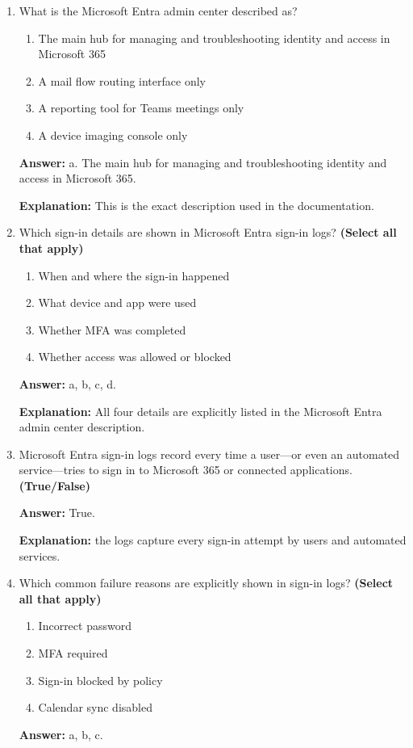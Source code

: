 \documentclass[10pt]{article}
\begin{document}
\begin{enumerate}[leftmargin=*]
\item What is the Microsoft Entra admin center described as?
\begin{enumerate}[label=\alph*., leftmargin=1.5em]
\item The main hub for managing and troubleshooting identity and access in Microsoft 365
\item A mail flow routing interface only
\item A reporting tool for Teams meetings only
\item A device imaging console only
\end{enumerate}
\textbf{Answer:} a. The main hub for managing and troubleshooting identity and access in Microsoft 365.

\textbf{Explanation:} This is the exact description used in the documentation.

\item Which sign-in details are shown in Microsoft Entra sign-in logs? \textbf{(Select all that apply)}
\begin{enumerate}[label=\alph*., leftmargin=1.5em]
\item When and where the sign-in happened
\item What device and app were used
\item Whether MFA was completed
\item Whether access was allowed or blocked
\end{enumerate}
\textbf{Answer:} a, b, c, d.

\textbf{Explanation:} All four details are explicitly listed in the Microsoft Entra admin center description.

\item Microsoft Entra sign-in logs record every time a user—or even an automated service—tries to sign in to Microsoft 365 or connected applications. \textbf{(True/False)}

\textbf{Answer:} True.

\textbf{Explanation:} the logs capture every sign-in attempt by users and automated services.

\item Which common failure reasons are explicitly shown in sign-in logs? \textbf{(Select all that apply)}
\begin{enumerate}[label=\alph*., leftmargin=1.5em]
\item Incorrect password
\item MFA required
\item Sign-in blocked by policy
\item Calendar sync disabled
\end{enumerate}
\textbf{Answer:} a, b, c.


\end{enumerate}
\end{document}
